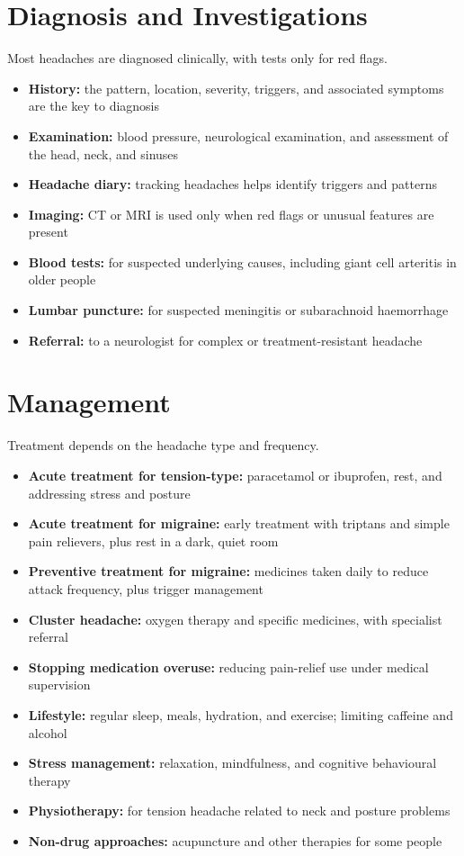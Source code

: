 \section*{Diagnosis and Investigations}
Most headaches are diagnosed clinically, with tests only for red flags.

\begin{itemize}
    \item \textbf{History:} the pattern, location, severity, triggers, and associated symptoms are the key to diagnosis
    \item \textbf{Examination:} blood pressure, neurological examination, and assessment of the head, neck, and sinuses
    \item \textbf{Headache diary:} tracking headaches helps identify triggers and patterns
    \item \textbf{Imaging:} CT or MRI is used only when red flags or unusual features are present
    \item \textbf{Blood tests:} for suspected underlying causes, including giant cell arteritis in older people
    \item \textbf{Lumbar puncture:} for suspected meningitis or subarachnoid haemorrhage
    \item \textbf{Referral:} to a neurologist for complex or treatment-resistant headache
\end{itemize}

\section*{Management}
Treatment depends on the headache type and frequency.

\begin{itemize}
    \item \textbf{Acute treatment for tension-type:} paracetamol or ibuprofen, rest, and addressing stress and posture
    \item \textbf{Acute treatment for migraine:} early treatment with triptans and simple pain relievers, plus rest in a dark, quiet room
    \item \textbf{Preventive treatment for migraine:} medicines taken daily to reduce attack frequency, plus trigger management
    \item \textbf{Cluster headache:} oxygen therapy and specific medicines, with specialist referral
    \item \textbf{Stopping medication overuse:} reducing pain-relief use under medical supervision
    \item \textbf{Lifestyle:} regular sleep, meals, hydration, and exercise; limiting caffeine and alcohol
    \item \textbf{Stress management:} relaxation, mindfulness, and cognitive behavioural therapy
    \item \textbf{Physiotherapy:} for tension headache related to neck and posture problems
    \item \textbf{Non-drug approaches:} acupuncture and other therapies for some people
\end{itemize}

